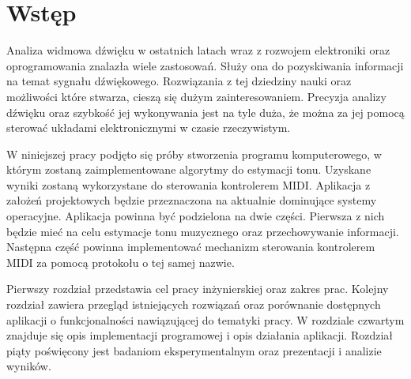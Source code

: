 \chapter*{Wstęp}
\label{wstęp}
\thispagestyle{empty}

Analiza widmowa dźwięku w ostatnich latach wraz z rozwojem elektroniki oraz oprogramowania znalazła wiele zastosowań. Służy ona do pozyskiwania informacji na temat sygnału dźwiękowego. Rozwiązania z tej dziedziny nauki oraz możliwości które stwarza, cieszą się dużym zainteresowaniem. Precyzja analizy dźwięku oraz szybkość jej wykonywania jest na tyle duża, że można za jej pomocą sterować układami elektronicznymi w czasie rzeczywistym.

	W niniejszej pracy podjęto się próby stworzenia programu komputerowego, w którym zostaną zaimplementowane algorytmy do estymacji tonu. Uzyskane wyniki zostaną wykorzystane do sterowania kontrolerem MIDI. Aplikacja z założeń projektowych będzie przeznaczona na aktualnie dominujące systemy operacyjne. Aplikacja powinna być podzielona na dwie części. Pierwsza z nich będzie mieć na celu estymacje tonu muzycznego oraz przechowywanie informacji. Następna część powinna implementować mechanizm sterowania kontrolerem MIDI za pomocą protokołu o tej samej nazwie.
	
Pierwszy rozdział przedstawia cel pracy inżynierskiej oraz zakres prac. Kolejny rozdział zawiera przegląd istniejących rozwiązań oraz porównanie dostępnych aplikacji o funkcjonalności nawiązującej do tematyki pracy. W rozdziale czwartym znajduje się opis implementacji programowej i opis działania aplikacji. Rozdział piąty poświęcony jest badaniom eksperymentalnym oraz prezentacji i analizie wyników.